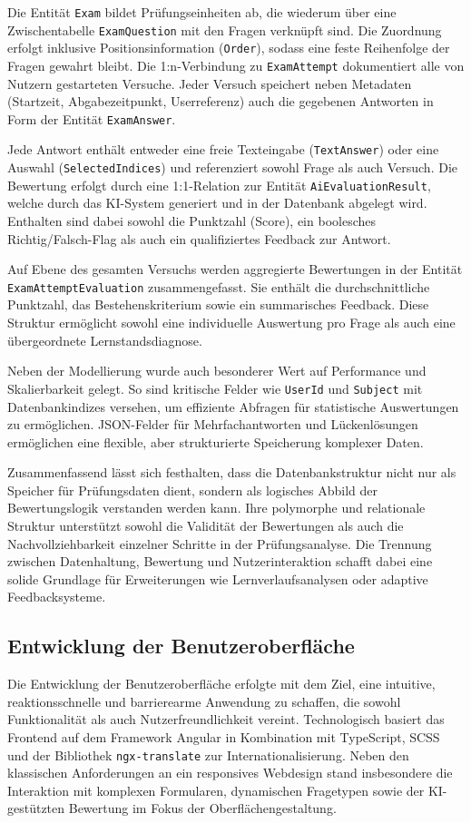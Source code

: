 \documentclass[a4paper,12pt]{article}
\begin{document}
Die Entität \texttt{Exam} bildet Prüfungseinheiten ab, die wiederum über eine Zwischentabelle \texttt{ExamQuestion} mit den Fragen verknüpft sind. Die Zuordnung erfolgt inklusive Positionsinformation (\texttt{Order}), sodass eine feste Reihenfolge der Fragen gewahrt bleibt. Die 1:n-Verbindung zu \texttt{ExamAttempt} dokumentiert alle von Nutzern gestarteten Versuche. Jeder Versuch speichert neben Metadaten (Startzeit, Abgabezeitpunkt, Userreferenz) auch die gegebenen Antworten in Form der Entität \texttt{ExamAnswer}.

Jede Antwort enthält entweder eine freie Texteingabe (\texttt{TextAnswer}) oder eine Auswahl (\texttt{SelectedIndices}) und referenziert sowohl Frage als auch Versuch. Die Bewertung erfolgt durch eine 1:1-Relation zur Entität \texttt{AiEvaluationResult}, welche durch das KI-System generiert und in der Datenbank abgelegt wird. Enthalten sind dabei sowohl die Punktzahl (Score), ein boolesches Richtig/Falsch-Flag als auch ein qualifiziertes Feedback zur Antwort.

Auf Ebene des gesamten Versuchs werden aggregierte Bewertungen in der Entität \\ \texttt{ExamAttemptEvaluation} zusammengefasst. Sie enthält die durchschnittliche Punktzahl, das Bestehenskriterium sowie ein summarisches Feedback. Diese Struktur ermöglicht sowohl eine individuelle Auswertung pro Frage als auch eine übergeordnete Lernstandsdiagnose.

Neben der Modellierung wurde auch besonderer Wert auf Performance und Skalierbarkeit gelegt. So sind kritische Felder wie \texttt{UserId} und \texttt{Subject} mit Datenbankindizes versehen, um effiziente Abfragen für statistische Auswertungen zu ermöglichen. JSON-Felder für Mehrfachantworten und Lückenlösungen ermöglichen eine flexible, aber strukturierte Speicherung komplexer Daten.

Zusammenfassend lässt sich festhalten, dass die Datenbankstruktur nicht nur als Speicher für Prüfungsdaten dient, sondern als logisches Abbild der Bewertungslogik verstanden werden kann. Ihre polymorphe und relationale Struktur unterstützt sowohl die Validität der Bewertungen als auch die Nachvollziehbarkeit einzelner Schritte in der Prüfungsanalyse. Die Trennung zwischen Datenhaltung, Bewertung und Nutzerinteraktion schafft dabei eine solide Grundlage für Erweiterungen wie Lernverlaufsanalysen oder adaptive Feedbacksysteme.

\subsection{Entwicklung der Benutzeroberfläche}
Die Entwicklung der Benutzeroberfläche erfolgte mit dem Ziel, eine intuitive, reaktionsschnelle und barrierearme Anwendung zu schaffen, die sowohl Funktionalität als auch Nutzerfreundlichkeit vereint. Technologisch basiert das Frontend auf dem Framework Angular in Kombination mit TypeScript, SCSS und der Bibliothek \texttt{ngx-translate} zur Internationalisierung. Neben den klassischen Anforderungen an ein responsives Webdesign stand insbesondere die Interaktion mit komplexen Formularen, dynamischen Fragetypen sowie der KI-gestützten Bewertung im Fokus der Oberflächengestaltung.
\end{document}
